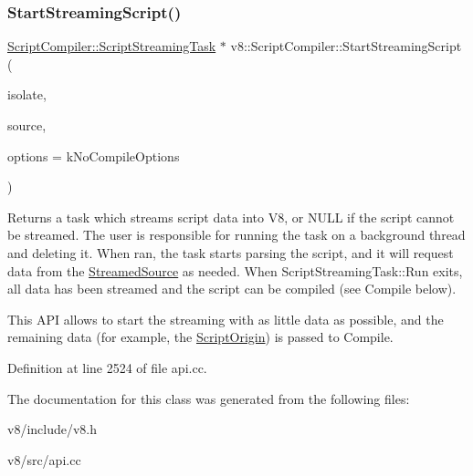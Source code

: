 \subsubsection{\texorpdfstring{Start\+Streaming\+Script()}{StartStreamingScript()}}
{\footnotesize\ttfamily \mbox{\hyperlink{classv8_1_1ScriptCompiler_1_1ScriptStreamingTask}{Script\+Compiler\+::\+Script\+Streaming\+Task}} $\ast$ v8\+::\+Script\+Compiler\+::\+Start\+Streaming\+Script (\begin{DoxyParamCaption}\item[{Isolate $\ast$}]{isolate,  }\item[{\mbox{\hyperlink{classv8_1_1ScriptCompiler_1_1StreamedSource}{Streamed\+Source}} $\ast$}]{source,  }\item[{Compile\+Options}]{options = {\ttfamily kNoCompileOptions} }\end{DoxyParamCaption})\hspace{0.3cm}{\ttfamily [static]}}

Returns a task which streams script data into V8, or N\+U\+LL if the script cannot be streamed. The user is responsible for running the task on a background thread and deleting it. When ran, the task starts parsing the script, and it will request data from the \mbox{\hyperlink{classv8_1_1ScriptCompiler_1_1StreamedSource}{Streamed\+Source}} as needed. When Script\+Streaming\+Task\+::\+Run exits, all data has been streamed and the script can be compiled (see Compile below).

This A\+PI allows to start the streaming with as little data as possible, and the remaining data (for example, the \mbox{\hyperlink{classv8_1_1ScriptOrigin}{Script\+Origin}}) is passed to Compile. 

Definition at line 2524 of file api.\+cc.



The documentation for this class was generated from the following files\+:\begin{DoxyCompactItemize}
\item 
v8/include/v8.\+h\item 
v8/src/api.\+cc\end{DoxyCompactItemize}
